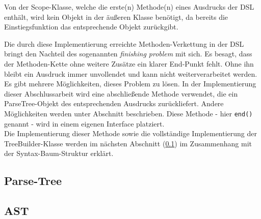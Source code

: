 Von der Scope-Klasse, welche die erste(n) Methode(n) eines Ausdrucks der DSL enthält, wird kein Objekt in der äußeren Klasse benötigt, da bereits die Einstiegsfunktion das entsprechende Objekt zurückgibt.

Die durch diese Implementierung erreichte Methoden-Verkettung in der DSL bringt den Nachteil des sogenannten \emph{finishing problem} \cite{book:fowlerDSL} mit sich. Es besagt, dass der Methoden-Kette ohne weitere Zusätze ein klarer End-Punkt fehlt. Ohne ihn bleibt ein Ausdruck immer unvollendet und kann nicht weiterverarbeitet werden. Es gibt mehrere Möglichkeiten, dieses Problem zu lösen. In der Implementierung dieser Abschlussarbeit wird eine abschließende Methode verwendet, die ein ParseTree-Objekt des entsprechenden Ausdrucks zurückliefert. Andere Möglichkeiten werden unter Abschnitt beschrieben. Diese Methode - hier \texttt{end()} genannt - wird in einem eigenen Interface platziert.\\
Die Implementierung dieser Methode sowie die vollständige Implementierung der TreeBuilder-Klasse werden im nächsten Abschnitt (\ref{ssct:4.3.3:parsetree}) im Zusammenhang mit der Syntax-Baum-Struktur erklärt.

\subsection{Parse-Tree}\label{ssct:4.3.3:parsetree}


\subsection{AST}\label{sct:4.3.4:ast}
